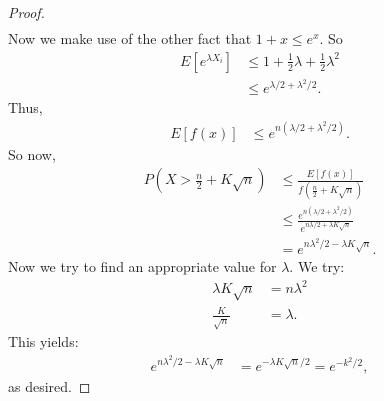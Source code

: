 \documentclass{report}
\begin{document}
\begin{proof}
\begin{align*}
    \end{align*}
    Now we make use of the other fact that $1 + x \leq e^x$. So
    \begin{align*}
        E[e^{\lambda X_i}] &\leq 1+ \frac 12 \lambda + \frac 12 \lambda^2 \\
        &\leq e^{\lambda/2 + \lambda^2/2}.
    \end{align*}
    Thus,
    \begin{align*}
        E[f(x)] &\leq e^{n(\lambda/2 + \lambda^2/2)}.
    \end{align*}
    So now,
\begin{align*}
    P\left(X > \frac n2 + K \sqrt n\right) &\leq \frac{E[f(x)]}{f\left(\frac n2 + K \sqrt n\right)} \\
    &\leq \frac{e^{n(\lambda/2 + \lambda^2/2)}}{e^{n\lambda/2 + \lambda K \sqrt n}} \\
    &= e^{n\lambda^2 / 2 - \lambda K \sqrt n}.
\end{align*}
Now we try to find an appropriate value for $\lambda$. We try:
\begin{align*}
    \lambda K \sqrt n &= n\lambda^2\\
    \frac{K}{\sqrt n} &= \lambda.
\end{align*}
This yields:
\begin{align*}
    e^{n\lambda^2 / 2 - \lambda K \sqrt n} &= e^{-\lambda K \sqrt  n /2} = e^{-k^2/2},
\end{align*}
as desired.
\end{proof}
\end{document}
